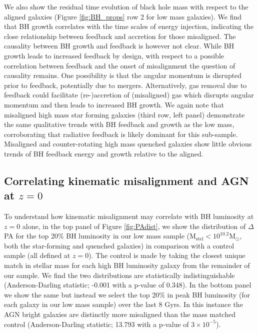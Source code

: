 We also show the residual time evolution of black hole mass with respect to the aligned galaxies (Figure \ref{fig:BH_props} row 2 for low mass galaxies). We find that BH growth correlates with the time scales of energy injection, indicating the close relationship between feedback and accretion for those misaligned. The causality between BH growth and feedback is however not clear. While BH growth leads to increased feedback by design, with respect to a possible correlation between feedback and the onset of misalignment the question of causality remains. One possibility is that the angular momentum is disrupted prior to feedback, potentially due to mergers. Alternatively, gas removal due to feedback could facilitate (re-)accretion of (misaligned) gas which disrupts angular momentum and then leads to increased BH growth. We again note that misaligned high mass star forming galaxies (third row, left panel) demonstrate the same qualitative trends with BH feedback and growth as the low mass, corroborating that radiative feedback is likely dominant for this sub-sample. Misaligned and counter-rotating high mass quenched galaxies show little obvious trends of BH feedback energy and growth relative to the aligned.

\subsection{Correlating kinematic misalignment and AGN at $z=0$}
To understand how kinematic misalignment may correlate with BH luminosity at $z=0$ alone, in the top panel of Figure \ref{fig:PAdist}, we show the distribution of $\Delta$PA for the top 20\% BH luminosity in our low mass sample ($\mathrm{M_{stel} < 10^{10.2}M_{\odot}}$, both the star-forming and quenched galaxies) in comparison with a control sample (all defined at $z=0$). The control is made by taking the closest unique match in stellar mass for each high BH luminosity galaxy from the remainder of our sample. We find the two distributions are statistically indistinguishable (Anderson-Darling statistic; -0.001 with a p-value of 0.348). In the bottom panel we show the same but instead we select the top 20\% in peak BH luminosity (for each galaxy in our low mass sample) over the last 8 Gyrs. In this instance the AGN bright galaxies are distinctly more misaligned than the mass matched control (Anderson-Darling statistic; 13.793 with a p-value of $3 \times 10^{-5}$). 

